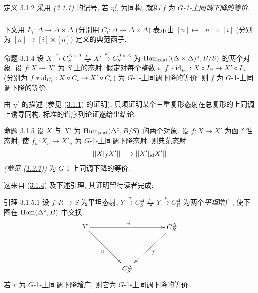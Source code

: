 \begin{enonce*}{定义 3.1.2}
采用 \emph{\hyperref[Vbis.prop3.1.1]{(3.1.1)}} 的记号,
若 $\eta^f_G$ 为同构, 就称 $f$ 为 \emph{$G$-1-上同调下降的等价}.
\end{enonce*}

\setcounter{subsubsection}{2}
\subsubsection{}
下文用 $L_i:\Delta\to\Delta\times\Delta$
(分别用 $C_i:\Delta\to\Delta\times\Delta$) 表示由
$[n]\longmapsto[n]\times[i]$ (分别为 $[n]\longmapsto[i]\times[n]$) 定义的典范函子.

\begin{enonce*}{命题 3.1.4}
设 $X\xrightarrow{u}C^{\Delta\times\Delta}_S$ 与
$X'\xrightarrow{u'}C^{\Delta\times\Delta}_S$
为 $\operatorname{Hom}_{\operatorname{plat}}((\Delta\times\Delta)^{\circ},B/S)$ 的两个对象.
设 $f:X\to X'$ 为 $S$ 上的态射.
假定对每个整数 $i$, $f\ast\id_{L_i}:X\circ L_i\to X'\circ L_i$
(分别为 $f\ast\id_{C_i}:X\circ C_i\to X'\circ C_i$)
为 $G$-1-上同调下降的等价. 则 $f$ 为 $G$-1-上同调下降的等价.
\end{enonce*}

由 $\eta^f$ 的描述 (参见 (\hyperref[Vbis.prop3.1.1]{3.1.1}) 的证明),
只须证明某个三重复形态射在总复形的上同调上诱导同构.
标准的谱序列论证遂给出结论.

\begin{enonce*}{命题 3.1.5}
设\pageoriginale{} $X$ 与 $X'$ 为 $\operatorname{Hom}_{\operatorname{plat}}(\Delta^{\circ},B/S)$ 的两个对象.
设 $f:X\to X'$ 为函子性态射, 使 $f_n:X_n\to X'_n$ 为 $G$-1-上同调下降态射.
则典范态射
$$
[[X|_fX']]\to[[X'|_{\id}X']]
$$
\emph{(参见 (\hyperref[Vbis.subsubsec1.2.7]{1.2.7}))} 为 $G$-1-上同调下降的等价.
\end{enonce*}

这来自 (\hyperref[Vbis.prop3.1.4]{3.1.4}) 及下述引理, 其证明留待读者完成:

\begin{enonce*}{引理 3.1.5.1}
设 $f:R\to S$ 为平坦态射, $Y\xrightarrow{u}C^{\Delta}_S$ 与
$Y\xrightarrow{v}C^{\Delta}_R$ 为两个\emph{平坦}增广,
使下图在 $\operatorname{Hom}(\Delta^{\circ},B)$ 中交换:
\[
\xymatrix@=1.5cm{
Y\ar[rr]^{v}\ar[rd]_{u}&&C^{\Delta}_R\ar[ld]^f\\
&C^{\Delta}_S&
}
\]
若 $v$ 为 $G$-1-上同调下降增广, 则它为 $G$-1-上同调下降的等价.
\end{enonce*}

